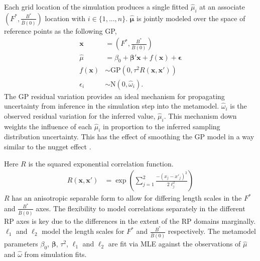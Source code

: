 \documentclass[12pt]{article}
\begin{document}
{%
Each grid location of the simulation produces a single fitted $\hat\mu_i$ at an
associate $\left(F^*, \frac{B^*}{\bar B(0)}\right)$ location with 
$i\in\{1,...,n\}$. $\bm{\hat\mu}$ is jointly modeled over the space of 
reference points as the following GP,
\begin{align}   \label{gpModel}
        \bm{x} &= \left(F^*, \frac{B^*}{\bar B(0)}\right) \nonumber\\
        \hat\mu &= \beta_0 + \bm{\beta}'\bm{x} + f(\bm{x}) + \bm{\epsilon} \nonumber \\
        f(\bm{x}) &\sim \text{GP}(0, \tau^2 R(\bm{x}, \bm{x'})) \nonumber \\
        \epsilon_i &\sim \text{N}(0, \hat\omega_i).
\end{align}
%
The GP residual variation provides an ideal mechanism for propagating uncertainty 
from inference in the simulation step into the metamodel. $\hat\omega_i$ is the 
observed residual variation for the inferred value, $\hat\mu_i$. This mechanism 
down weights the influence of each $\hat\mu_i$ in proportion to the inferred 
sampling distribution uncertainty. This has the effect of smoothing the GP 
model in a way similar to the nugget effect . %


%
Here $R$ is the squared exponential correlation function.
\begin{align}   \label{corModel}
R(\bm{x}, \bm{x'}) &= \exp\left( \sum_{j=1}^2 \frac{-(x_j-x'_j)^2}{2\ell_j^2} \right) %
\end{align}
$R$ has an anisotropic separable form to allow for differing length scales in 
the $F^*$ and $\frac{B^*}{\bar B(0)}$ axes. The flexibility to model 
correlations separately in the different RP axes is key due to the 
differences in the extent of the RP domains marginally. $\ell_1$ and 
$\ell_2$ model the length scales for $F^*$ and $\frac{B^*}{\bar B(0)}$ 
respectively. The metamodel parameters $\beta_0$, $\bm{\beta}$, $\tau^2$, 
$\ell_1$ and $\ell_2$ are fit via MLE against the observations of $\hat\mu$ 
and $\hat\omega$ from  simulation fits. 

}
\end{document}
